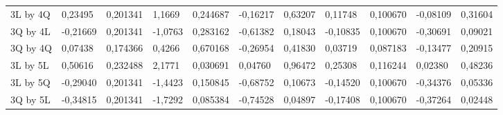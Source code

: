 \begin{table}[]
{\begin{tabular}{lllllllllll}
\rowcolor[HTML]{FFFFFF} 
3L by 4Q                              & {\color[HTML]{181A1B} 0,23495}  & {\color[HTML]{181A1B} 0,201341} & {\color[HTML]{181A1B} 1,1669}   & {\color[HTML]{181A1B} 0,244687} & {\color[HTML]{181A1B} -0,16217}       & {\color[HTML]{181A1B} 0,63207}        & {\color[HTML]{181A1B} 0,11748}  & {\color[HTML]{181A1B} 0,100670}      & {\color[HTML]{181A1B} -0,08109}       & {\color[HTML]{181A1B} 0,31604}        \\
\rowcolor[HTML]{FFFFFF} 
3Q by 4L                              & {\color[HTML]{181A1B} -0,21669} & {\color[HTML]{181A1B} 0,201341} & {\color[HTML]{181A1B} -1,0763}  & {\color[HTML]{181A1B} 0,283162} & {\color[HTML]{181A1B} -0,61382}       & {\color[HTML]{181A1B} 0,18043}        & {\color[HTML]{181A1B} -0,10835} & {\color[HTML]{181A1B} 0,100670}      & {\color[HTML]{181A1B} -0,30691}       & {\color[HTML]{181A1B} 0,09021}        \\
\rowcolor[HTML]{FFFFFF} 
3Q by 4Q                              & {\color[HTML]{181A1B} 0,07438}  & {\color[HTML]{181A1B} 0,174366} & {\color[HTML]{181A1B} 0,4266}   & {\color[HTML]{181A1B} 0,670168} & {\color[HTML]{181A1B} -0,26954}       & {\color[HTML]{181A1B} 0,41830}        & {\color[HTML]{181A1B} 0,03719}  & {\color[HTML]{181A1B} 0,087183}      & {\color[HTML]{181A1B} -0,13477}       & {\color[HTML]{181A1B} 0,20915}        \\
\rowcolor[HTML]{FFFFFF} 
3L by 5L                              & {\color[HTML]{FF0000} 0,50616}  & {\color[HTML]{FF0000} 0,232488} & {\color[HTML]{FF0000} 2,1771}   & {\color[HTML]{FF0000} 0,030691} & {\color[HTML]{FF0000} 0,04760}        & {\color[HTML]{FF0000} 0,96472}        & {\color[HTML]{FF0000} 0,25308}  & {\color[HTML]{FF0000} 0,116244}      & {\color[HTML]{FF0000} 0,02380}        & {\color[HTML]{FF0000} 0,48236}        \\
\rowcolor[HTML]{FFFFFF} 
3L by 5Q                              & {\color[HTML]{181A1B} -0,29040} & {\color[HTML]{181A1B} 0,201341} & {\color[HTML]{181A1B} -1,4423}  & {\color[HTML]{181A1B} 0,150845} & {\color[HTML]{181A1B} -0,68752}       & {\color[HTML]{181A1B} 0,10673}        & {\color[HTML]{181A1B} -0,14520} & {\color[HTML]{181A1B} 0,100670}      & {\color[HTML]{181A1B} -0,34376}       & {\color[HTML]{181A1B} 0,05336}        \\
\rowcolor[HTML]{FFFFFF} 
3Q by 5L                              & {\color[HTML]{181A1B} -0,34815} & {\color[HTML]{181A1B} 0,201341} & {\color[HTML]{181A1B} -1,7292}  & {\color[HTML]{181A1B} 0,085384} & {\color[HTML]{181A1B} -0,74528}       & {\color[HTML]{181A1B} 0,04897}        & {\color[HTML]{181A1B} -0,17408} & {\color[HTML]{181A1B} 0,100670}      & {\color[HTML]{181A1B} -0,37264}       & {\color[HTML]{181A1B} 0,02448}        \\

\end{tabular}}
\end{table}

